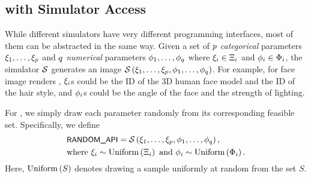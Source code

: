 \subsection{\simpe{} with Simulator Access}
\label{sec:method_simulator}
While different simulators have very different programming interfaces, most of them can be abstracted in the same way. Given a set of $p$ \emph{categorical} parameters $\xi_1,\ldots,\xi_p$ and $q$ \emph{numerical} parameters $\phi_1,\ldots,\phi_q$ where $\xi_i\in \Xi_i$ and $\phi_i\in \Phi_i$, the simulator $\mathcal{S}$ generates an image $\mathcal{S}\left( \xi_1,\ldots,\xi_p,\phi_1,\ldots,\phi_q \right)$. For example, for face image renders \cite{wood2021fake,bae2023digiface}, $\xi_i$s could be the ID of the 3D human face model and the ID of the hair style, and $\phi_i$s could be the angle of the face and the strength of lighting.

For \randomsampleapiname{}, we simply draw each parameter randomly from its corresponding feasible set. Specifically, we define
\begin{align}
    &\randomsampleapiname{} = \simulatorfun{\cate_1,\ldots,\cate_\numcate,\nume_1,\ldots,\nume_\numnume},\label{eq:simulator_random_api}\\
    &\text{where } \cate_i \sim \uniform{\cateset_i} \text{ and } \nume_i \sim \uniform{\numeset_i}.\nonumber
\end{align}
Here, $\text{Uniform}\left( S \right)$ denotes drawing a sample uniformly at random from the set $S$.


